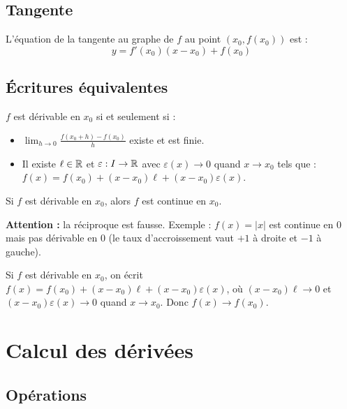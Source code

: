 \subsection{Tangente}

L'équation de la tangente au graphe de $f$ au point $(x_0, f(x_0))$ est :
\[y = f'(x_0)(x - x_0) + f(x_0)\]

\subsection{Écritures équivalentes}

\begin{propbox}
$f$ est dérivable en $x_0$ si et seulement si :
\begin{itemize}[leftmargin=1cm]
  \item $\displaystyle\lim_{h \to 0} \frac{f(x_0 + h) - f(x_0)}{h}$ existe et est finie.
  \item Il existe $\ell \in \mathbb{R}$ et $\varepsilon : I \to \mathbb{R}$ avec $\varepsilon(x) \to 0$ quand $x \to x_0$ tels que : $f(x) = f(x_0) + (x - x_0)\ell + (x - x_0)\varepsilon(x)$.
\end{itemize}
\end{propbox}

\begin{propbox}
Si $f$ est dérivable en $x_0$, alors $f$ est continue en $x_0$.

\medskip
\textbf{Attention :} la réciproque est fausse. Exemple : $f(x) = |x|$ est continue en $0$ mais pas dérivable en $0$ (le taux d'accroissement vaut $+1$ à droite et $-1$ à gauche).
\end{propbox}

\begin{proofbox}
Si $f$ est dérivable en $x_0$, on écrit $f(x) = f(x_0) + (x - x_0)\ell + (x - x_0)\varepsilon(x)$, où $(x-x_0)\ell \to 0$ et $(x-x_0)\varepsilon(x) \to 0$ quand $x \to x_0$. Donc $f(x) \to f(x_0)$.
\end{proofbox}


\section{Calcul des dérivées}

\subsection{Opérations}

